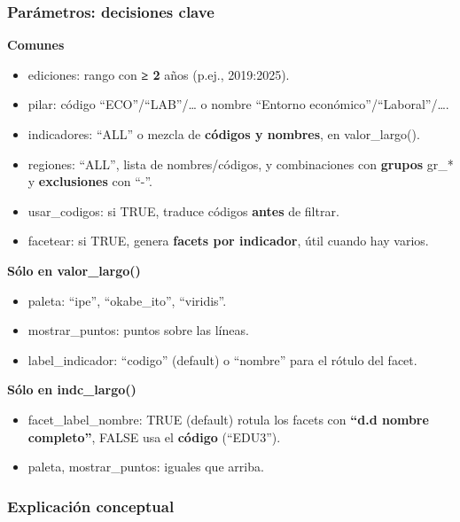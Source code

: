 \documentclass[
  11pt,
  letterpaper,
  DIV=11,
  numbers=noendperiod]{scrartcl}
\begin{document}
\subsubsection{\texorpdfstring{\textbf{Parámetros: decisiones
clave}}{Parámetros: decisiones clave}}\label{paruxe1metros-decisiones-clave}

\textbf{Comunes}

\begin{itemize}
\item
  ediciones: rango con \textbf{≥ 2} años (p.ej., 2019:2025).
\item
  pilar: código ``ECO''/``LAB''/\ldots{} o nombre ``Entorno
  económico''/``Laboral''/\ldots.
\item
  indicadores: ``ALL'' o mezcla de \textbf{códigos y nombres}, en
  valor\_largo().
\item
  regiones: ``ALL'', lista de nombres/códigos, y combinaciones con
  \textbf{grupos} gr\_* y \textbf{exclusiones} con ``-''.
\item
  usar\_codigos: si TRUE, traduce códigos \textbf{antes} de filtrar.
\item
  facetear: si TRUE, genera \textbf{facets por indicador}, útil cuando
  hay varios.
\end{itemize}

\textbf{Sólo en valor\_largo()}

\begin{itemize}
\item
  paleta: ``ipe'', ``okabe\_ito'', ``viridis''.
\item
  mostrar\_puntos: puntos sobre las líneas.
\item
  label\_indicador: ``codigo'' (default) o ``nombre'' para el rótulo del
  facet.
\end{itemize}

\textbf{Sólo en indc\_largo()}

\begin{itemize}
\item
  facet\_label\_nombre: TRUE (default) rotula los facets con
  \textbf{``d.d nombre completo''}, FALSE usa el \textbf{código}
  (``EDU3'').
\item
  paleta, mostrar\_puntos: iguales que arriba.
\end{itemize}

\subsubsection{\texorpdfstring{\textbf{Explicación
conceptual}}{Explicación conceptual}}\label{explicaciuxf3n-conceptual-12}
\end{document}
